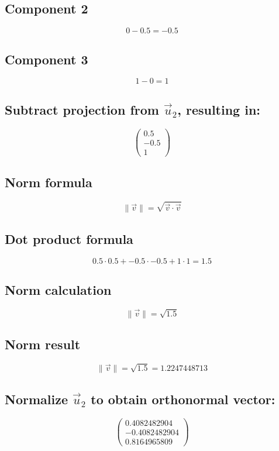 \documentclass{article}
\begin{document}
\subsection*{ \vspace{1em} Component 2}
\[
0 - 0.5 = -0.5
\]
\subsection*{ \vspace{1em} Component 3}
\[
1 - 0 = 1
\]
\subsection*{ \vspace{1em} Subtract projection from \(\vec{u}_{2}\), resulting in:}
\[
\begin{pmatrix}0.5 \\ -0.5 \\ 1\end{pmatrix}
\]
\subsection*{ \vspace{1em} Norm formula}
\[
\|\vec{v}\| = \sqrt{\vec{v} \cdot \vec{v}}
\]
\subsection*{ \vspace{1em} Dot product formula}
\[
0.5 \cdot 0.5 + -0.5 \cdot -0.5 + 1 \cdot 1 = 1.5
\]
\subsection*{ \vspace{1em} Norm calculation}
\[
\|\vec{v}\| = \sqrt{1.5}
\]
\subsection*{ \vspace{1em} Norm result}
\[
\|\vec{v}\| = \sqrt{1.5} = 1.2247448713
\]
\subsection*{ \vspace{1em} Normalize \(\vec{u}_{2}\) to obtain orthonormal vector:}
\[
\begin{pmatrix}0.4082482904 \\ -0.4082482904 \\ 0.8164965809\end{pmatrix}
\]
\end{document}
